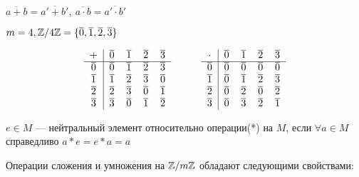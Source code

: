 $\overline{a + b} = \overline{a' + b'},~\overline{a \cdot b} = \overline{a' \cdot b'}$

\begin{example}
    $m = 4, \mathbb{Z}/4\mathbb{Z} = \{\overline{0}, \overline{1}, \overline{2}, \overline{3}\}$
\end{example}

\[
\begin{tabular}{c|cccc}
    $+$ & $\overline{0}$ & $\overline{1}$ & $\overline{2}$ & $\overline{3}$\\
    \hline
    $\overline{0}$ & $\overline{0}$ & $\overline{1}$ & $\overline{2}$ & $\overline{3}$\\
    $\overline{1}$ & $\overline{1}$ & $\overline{2}$ & $\overline{3}$ & $\overline{0}$\\
    $\overline{2}$ & $\overline{2}$ & $\overline{3}$ & $\overline{0}$ & $\overline{1}$\\
    $\overline{3}$ & $\overline{3}$ & $\overline{0}$ & $\overline{1}$ & $\overline{2}$
\end{tabular}
\quad\quad\quad
\begin{tabular}{c|cccc}
    $\cdot$ & $\overline{0}$ & $\overline{1}$ & $\overline{2}$ & $\overline{3}$\\
    \hline
    $\overline{0}$ & $\overline{0}$ & $\overline{0}$ & $\overline{0}$ & $\overline{0}$\\
    $\overline{1}$ & $\overline{0}$ & $\overline{1}$ & $\overline{2}$ & $\overline{3}$\\
    $\overline{2}$ & $\overline{0}$ & $\overline{2}$ & $\overline{0}$ & $\overline{2}$\\
    $\overline{3}$ & $\overline{0}$ & $\overline{3}$ & $\overline{2}$ & $\overline{1}$
\end{tabular}
\]

\begin{defn}
    $e \in M$ --- нейтральный элемент относительно операции(*) на $M$, если $\forall a \in M$ справедливо $a * e = e * a = a$
\end{defn}

\begin{theorem-non}
    Операции сложения и умножения на $\mathbb{Z}/m\mathbb{Z}$ обладают следующими свойствами:
\end{theorem-non}

